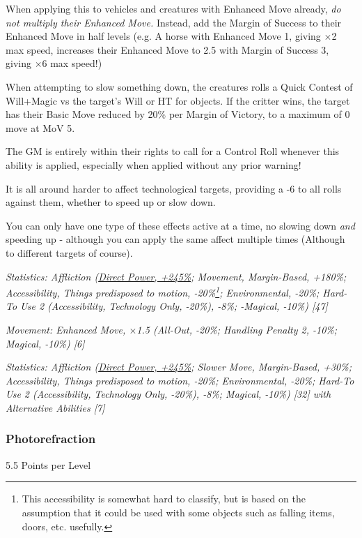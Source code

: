 \begin{multicols*}{3}
	When applying this to vehicles and creatures with Enhanced Move already, \textit{do not multiply their Enhanced Move.} Instead, add the Margin of Success to their Enhanced Move in half levels (e.g. A horse with Enhanced Move 1, giving \(\times\)2 max speed, increases their Enhanced Move to 2.5 with Margin of Success 3, giving \(\times\)6 max speed!)
	
	When attempting to slow something down, the creatures rolls a Quick Contest of Will+Magic vs the target's Will or HT for objects. If the critter wins, the target has their Basic Move reduced by 20\% per Margin of Victory, to a maximum of 0 move at MoV 5.
	
	The GM is entirely within their rights to call for a Control Roll whenever this ability is applied, especially when applied without any prior warning!
	
	It is all around harder to affect technological targets, providing a -6 to all rolls against them, whether to speed up or slow down.
	
	You can only have one type of these effects active at a time, no slowing down \textit{and} speeding up - although you can apply the same affect multiple times (Although to different targets of course).
	
	\textcolor{OliveGreen}{\textit{Statistics: Affliction (\hyperref[cp_ct]{Direct Power, +245\%}; Movement, Margin-Based, +180\%; Accessibility, Things predisposed to motion, -20\%\footnote{This accessibility is somewhat hard to classify, but is based on the assumption that it could be used with some objects such as falling items, doors, etc. usefully.}; Environmental, -20\%; Hard-To Use 2 (Accessibility, Technology Only, -20\%), -8\%; -Magical, -10\%) [47]}}
	
	\textcolor{OliveGreen}{\textit{Movement: Enhanced Move, \(\times\)1.5 (All-Out, -20\%; Handling Penalty 2, -10\%; Magical, -10\%) [6]}}
	
	\textcolor{OliveGreen}{\textit{Statistics: Affliction (\hyperref[cp_ct]{Direct Power, +245\%}; Slower Move, Margin-Based, +30\%; Accessibility, Things predisposed to motion, -20\%; Environmental, -20\%; Hard-To Use 2 (Accessibility, Technology Only, -20\%), -8\%; Magical, -10\%) [32] with Alternative Abilities [7]}}
	
	
	\subsubsection{Photorefraction}\label{photorefraction}
	\begin{flushright}
		5.5 Points per Level
	\end{flushright}


\end{multicols*}
